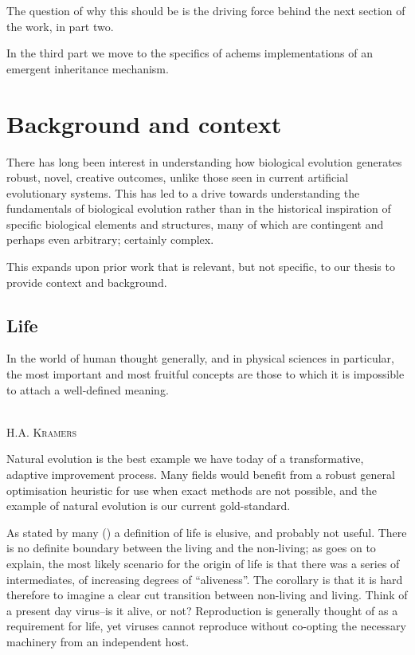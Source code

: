 \begin{DRAFT}
The question of why this should be is the driving force behind the next section of the work, in part two. 

In the third part we move to the specifics of \glspl{achem} implementations of an emergent inheritance mechanism.  
\end{DRAFT}

\section{Background and context}\label{background-and-context}

There has long been interest in understanding how biological evolution generates robust, novel, creative outcomes, unlike those seen in current artificial evolutionary systems. This has led to a drive towards understanding the fundamentals of biological evolution rather than in the historical inspiration of specific biological elements and structures, many of which are contingent and perhaps even arbitrary; certainly complex.
	
This  expands upon prior work that is relevant, but not specific, to our thesis to provide context and background.

\subsection{Life}\label{life}

\epigraph{%
In the world of human thought generally, and in physical sciences in particular, the most important and most fruitful concepts are those to which it is impossible to attach a well-defined meaning.}%
{\textsc{\\H.A. Kramers}}

Natural evolution is the best example we have today of a transformative, adaptive improvement process. Many fields would benefit from a robust general optimisation heuristic for use when exact methods are not possible, and the example of natural evolution is our current gold-standard. 

As stated by many (\eg \cite{Pascal2013, Malaterre2015}) a definition of life is elusive, and probably not useful. There is no definite boundary between the living and the non-living; as \parencite{Pascal2013} goes on to explain, the most likely scenario for the origin of life is that there was a series of intermediates, of increasing degrees of ``aliveness''. The corollary is that it is hard therefore to imagine a clear cut transition between non-living and living. Think of a present day virus--is it alive, or not? Reproduction is generally thought of as a requirement for life, yet viruses cannot reproduce without co-opting the necessary machinery from an independent host. 

